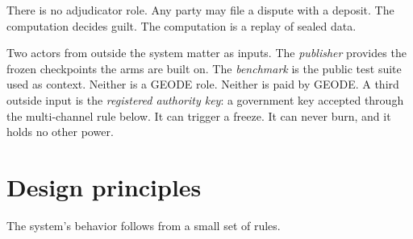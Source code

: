 \documentclass[11pt]{article}
\begin{document}
There is no adjudicator role. Any party may file a dispute with a
deposit. The computation decides guilt. The computation is a
replay of sealed data.

Two actors from outside the system matter as inputs. The
\emph{publisher} provides the frozen checkpoints the arms are
built on. The \emph{benchmark} is the public test suite used as
context. Neither is a GEODE role. Neither is paid by GEODE. A
third outside input is the \emph{registered authority key}: a
government key accepted through the multi-channel rule below. It
can trigger a freeze. It can never burn, and it holds no other
power.

\section{Design principles}

The system's behavior follows from a small set of rules.
\end{document}
